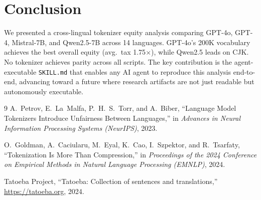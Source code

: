 \documentclass[11pt]{article}
\begin{document}
\section{Conclusion}

We presented a cross-lingual tokenizer equity analysis comparing GPT-4o, GPT-4, Mistral-7B, and Qwen2.5-7B across 14 languages.
GPT-4o's 200K vocabulary achieves the best overall equity (avg.\ tax 1.75$\times$), while Qwen2.5 leads on CJK.
No tokenizer achieves parity across all scripts.
The key contribution is the agent-executable \texttt{SKILL.md} that enables any AI agent to reproduce this analysis end-to-end, advancing toward a future where research artifacts are not just readable but autonomously executable.

\begin{thebibliography}{9}
A.~Petrov, E.~La~Malfa, P.~H.~S.~Torr, and A.~Biber,
``Language Model Tokenizers Introduce Unfairness Between Languages,''
in \emph{Advances in Neural Information Processing Systems (NeurIPS)}, 2023.

O.~Goldman, A.~Caciularu, M.~Eyal, K.~Cao, I.~Szpektor, and R.~Tsarfaty,
``Tokenization Is More Than Compression,''
in \emph{Proceedings of the 2024 Conference on Empirical Methods in Natural Language Processing (EMNLP)}, 2024.

Tatoeba Project,
``Tatoeba: Collection of sentences and translations,''
\url{https://tatoeba.org}, 2024.
\end{thebibliography}
\end{document}
